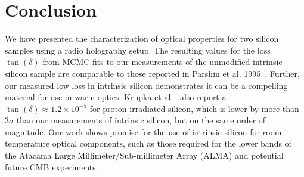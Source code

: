 \section{Conclusion}
\label{sec:si_conclusion}
We have presented the characterization of optical properties for two silicon samples using a radio holography setup.  The resulting values for the loss $\tan(\delta)$ from MCMC fits to our measurements of the unmodified intrinsic silicon sample are comparable to those reported in Parshin et al. 1995~\cite{parshin}.  Further, our measured low loss in intrinsic silicon demonstrates it can be a compelling material for use in warm optics.  Krupka et al.~\cite{KRUPKA201676} also report a $\tan(\delta) \approx 1.2\times10^{-5}$ for proton-irradiated silicon, which is lower by more than $3\sigma$ than our measurements of intrinsic silicon, but on the same order of magnitude.  Our work shows promise for the use of intrinsic silicon for room-temperature optical components, such as those required for the lower bands of the Atacama Large Millimeter/Sub-millimeter Array (ALMA) and potential future CMB experiments.


